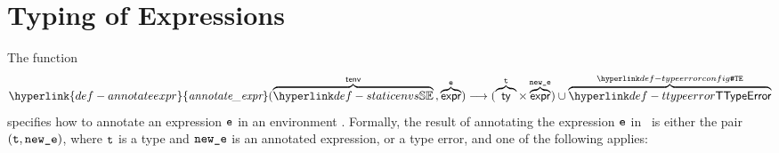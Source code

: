 \documentclass{book}
\newcommand\annotateexpr[1]{\hyperlink{def-annotateexpr}{\textfunc{annotate\_expr}}(#1)}
\begin{document}

\chapter{Typing of Expressions \label{chap:typingexpr}}
\hypertarget{def-annotateexpr}{}
The function
\[
  \annotateexpr{\overname{\staticenvs}{\tenv} \aslsep \overname{\expr}{\ve}}
  \aslto (\overname{\ty}{\vt} \times \overname{\expr}{\newe})
  \cup \overname{\TTypeError}{\TypeErrorConfig}
\]
specifies how to annotate an expression $\texttt{e}$ in
an environment \tenv.  Formally, the result of annotating the expression
$\texttt{e}$ in \tenv\ is either the pair $(\texttt{t}, \texttt{new\_e})$, where $\texttt{t}$ is a type and
$\texttt{new\_e}$ is an annotated expression, or a type error, and one of the following applies:
\end{document}
